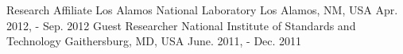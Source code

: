 \begin{cventries}
{    %
  }
  \cventry
  {Research Affiliate} %
  {Los Alamos National Laboratory} %
  {Los Alamos, NM, USA} %
  {Apr. 2012, - Sep. 2012} %
  {
  }
  \cventry
  {Guest Researcher} %
  {National Institute of Standards and Technology} %
  {Gaithersburg, MD, USA} %
  {June. 2011, - Dec. 2011} %
  {
  }



\end{cventries}
